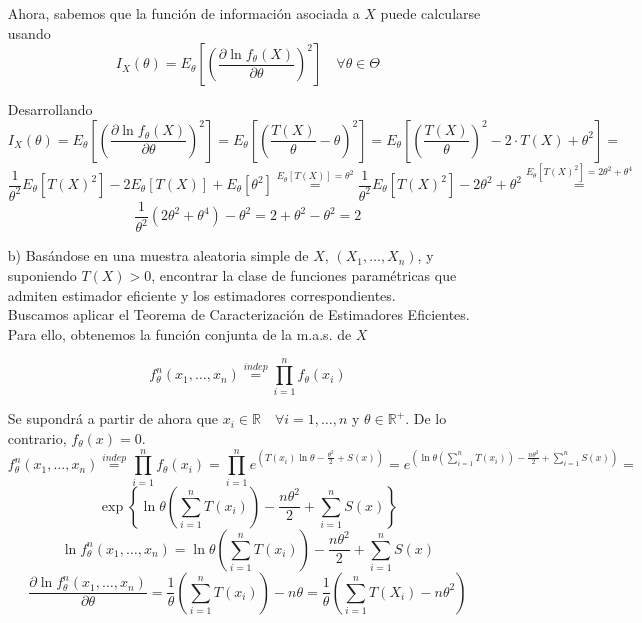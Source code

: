 \documentclass[12pt]{article}
\newcommand{\R}{\mathbb{R}}
\newcommand{\Rmas}{\R^{+}}
\begin{document}
\begin{ejercicio}[2 puntos]
\begin{enumerate}
            Ahora, sabemos que la función de información asociada a $X$ puede calcularse usando
            $$I_X(\theta) = E_\theta \left[ \left( \dfrac{\partial \ln f_\theta (X)}{\partial \theta} \right)^2 \right] \quad \forall \theta
            \in \Theta$$

            Desarrollando
            $$I_X(\theta) = E_\theta \left[ \left( \dfrac{\partial \ln f_\theta (X)}{\partial \theta} \right)^2 \right] = 
            E_\theta \left[ \left( \dfrac{T(X)}{\theta} - \theta \right)^2 \right] = 
            E_\theta \left[ \left(\dfrac{T(X)}{\theta} \right)^2 - 2 \cdot T(X) + \theta^2 \right] =$$
            $$\dfrac{1}{\theta^2} E_\theta [T(X)^2] - 2 E_\theta[T(X)] + E_\theta[\theta^2] \stackrel{E_\theta[T(X)] = \theta^2}{=} 
            \dfrac{1}{\theta^2} E_\theta [T(X)^2] - 2 \theta^2 + \theta^2 \stackrel{E_\theta[T(X)^2] = 2 \theta^2 + \theta^4}{=}$$
            $$\dfrac{1}{\theta^2} (2 \theta^2 + \theta^4) - \theta^2 = 2 + \theta^2 - \theta^2 = 2$$

            \item[b)] Basándose en una muestra aleatoria simple de $X$, $(X_1,\dots,X_n)$, y
            suponiendo $T(X)>0$, encontrar la clase de funciones paramétricas que admiten
            estimador eficiente y los estimadores correspondientes. \\

            Buscamos aplicar el Teorema de Caracterización de Estimadores Eficientes. Para ello, obtenemos la función conjunta de la m.a.s. de $X$

            $$f_\theta^n(x_1, \ldots, x_n) \stackrel{indep}{=} \prod_{i=1}^n f_\theta(x_i)$$

            Se supondrá a partir de ahora que $x_i \in \R \quad \forall i=1,\ldots,n$ y $\theta \in \Rmas$. De lo contrario, $f_\theta(x) = 0$.
            $$f_\theta^n(x_1, \ldots, x_n) \stackrel{indep}{=} \prod_{i=1}^n f_\theta(x_i) = \prod_{i=1}^n 
            e^{\left(T(x_i)\ln\theta-\frac{\theta^2}{2}+S(x)\right)} = e^{\left(\ln\theta(\sum_{i=1}^n T(x_i))-\frac{n\theta^2}{2}+ \sum_{i=1}^{n}S(x)\right)} =$$
            $$\exp \left\{\ln\theta \left(\sum_{i=1}^n T(x_i) \right)-\frac{n\theta^2}{2}+ \sum_{i=1}^{n}S(x)\right\}$$
            $$\ln f_\theta^n(x_1, \ldots, x_n) = \ln\theta \left(\sum_{i=1}^n T(x_i) \right)-\frac{n\theta^2}{2}+ \sum_{i=1}^{n}S(x)$$
            $$\dfrac{\partial \ln f_\theta^n(x_1, \ldots, x_n)}{\partial \theta} = \dfrac{1}{\theta} \left(\sum_{i=1}^n T(x_i) \right) - 
            n \theta = \dfrac{1}{\theta} \left( \sum_{i=1}^{n} T(X_i) - n \theta^2 \right)$$


\end{enumerate}
\end{ejercicio}
\end{document}
